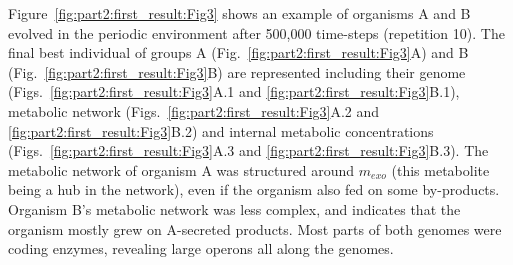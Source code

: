 \begin{table}[!ht]
\begin{adjustwidth}{-0in}{0in}
\centering
\caption[Comparison of the structure of the genome and metabolic network structure of final A organisms evolved in the continuous and periodic environments.]{{\bf Comparison of the structure of the genome and metabolic network structure of final A organisms evolved in the continuous and periodic environments.} Five variables were evaluated: \textbf{(i)} the mean genome size, \textbf{(ii)} the mean amount of non-coding DNA, \textbf{(iii)} the mean number of E encoding the same metabolic reaction (the ``metabolic redundancy"), \textbf{(iv)} the mean number of different essential metabolites pumped in (the ``uptake diversity"), and \textbf{(v)} the mean number of different essential metabolites produced (the ``production diversity"). The standard deviation is also shown (mean $\pm$ sd.). For each measure, we performed a two-samples Wilcoxon test, with Bonferroni correction ($n=5$).}
\label{table:part2:first_result:table3}
\end{adjustwidth}
\end{table}

Figure~\ref{fig:part2:first_result:Fig3} shows an example of organisms A and B evolved in the periodic environment after 500,000 time-steps (repetition 10). The final best individual of groups A (Fig.~\ref{fig:part2:first_result:Fig3}A) and B (Fig.~\ref{fig:part2:first_result:Fig3}B) are represented including their genome (Figs.~\ref{fig:part2:first_result:Fig3}A.1 and \ref{fig:part2:first_result:Fig3}B.1), metabolic network (Figs.~\ref{fig:part2:first_result:Fig3}A.2 and \ref{fig:part2:first_result:Fig3}B.2) and internal metabolic concentrations (Figs.~\ref{fig:part2:first_result:Fig3}A.3 and \ref{fig:part2:first_result:Fig3}B.3). The metabolic network of organism A was structured around $m_{exo}$ (this metabolite being a hub in the network), even if the organism also fed on some by-products. Organism B's metabolic network was less complex, and indicates that the organism mostly grew on A-secreted products. Most parts of both genomes were coding enzymes, revealing large operons all along the genomes.

